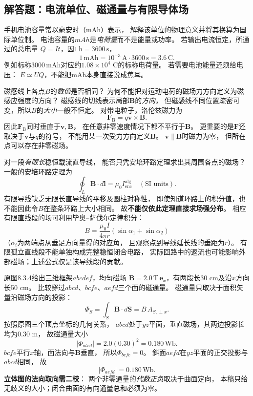 
\subsection{解答题：电流单位、磁通量与有限导体场}

\problemtext 手机电池容量常以毫安时（mAh）表示，
解释该单位的物理意义并将其换算为国际单位制。
\workings
电池容量的$mAh$是\emph{电荷量}而不是能量或功率。
若输出电流恒定，所通过的总电量
$Q=It$，因$1\,\mathrm{h}=3600\,\mathrm s$，
\[
\boxed{1\,\mathrm{mAh}=10^{-3}\,\mathrm A\cdot3600\,\mathrm s
=3.6\,\mathrm C}.
\]
例如标称$3000\,\mathrm{mAh}$对应约$1.08\times10^4$ C的标称电荷量。
\crosscheck 若需要电池能量还须给电压：
$E\simeq UQ$，不能把mAh本身直接说成焦耳。

\problemtext 磁感线上各点$B$的\emph{数值}是否相同？
为何不能把对运动电荷的磁场力方向定义为磁感应强度的方向？
\workings
磁感线的切线表示局部$\bm B$的\emph{方向}，
但磁感线不同位置疏密可变，所以$B$的\emph{大小}一般不恒定。
对带电粒子，洛伦兹磁力为
\[
\boxed{\bm F_{\mathrm B}=q\bm v\times\bm B}.
\]
因此$\bm F_{\mathrm B}$同时垂直于$\bm v,\bm B$，
在任意非零速度情况下都不平行于$\bm B$。
更重要的是$\bm F$还取决于$\bm v$与$q$的符号，
不能用某一次受力方向定义$\bm B$。
\crosscheck $\bm v\parallel\bm B$时磁力为零，
但所在点可以存在非零磁场。

\problemtext 对一段\emph{有限长}稳恒载流直导线，
能否只凭安培环路定理求出其周围各点的磁场？
\workings
一般的安培环路定理为
\[
\oint_L\bm B\cdot d\bm l=\mu_0I_{\mathrm{enc}}^{\mathrm{alg}}
\quad(\text{SI units}).
\]
有限导线缺乏无限长直导线的平移及圆柱对称性，
即使知道环路上的积分值，也不能因此令$B$在整条环路上大小相同。
故\textbf{不能仅依此定理直接求场强分布}。
相应有限直线段的场可利用毕奥--萨伐尔定律积分：
\[
\boxed{B=\frac{\mu_0I}{4\pi r}
(\sin\alpha_1+\sin\alpha_2)}
\]
（$\alpha_i$为两端点从垂足方向量得的对应角，
且观察点到导线延长线的垂距为$r$）。
\crosscheck 有限孤立直线段不能单独构成完整稳恒闭合电路，
实际回路中的返流也可能影响外部磁场；上述公式仅是该导线段的贡献。

\problemtext 原图8.3.4给出三维框架$abcdef$，均匀磁场
$\bm B=2.0\,\mathrm T\,\bm e_x$，有两段长30 cm及沿$x$方向长50 cm。
比较穿过$abcd$、$bcfe$、$aefd$三个面的磁通量。
\workings
磁通量只取决于面积矢量沿磁场方向的投影：
\[
\boxed{\Phi_S=\int_S\bm B\cdot d\bm S
=B\,A_{S,\perp x}}.
\]
按照原图三个顶点坐标的几何关系，
$abcd$处于$yz$平面，垂直磁场，其两边投影长均为$0.30$ m，
故磁通量大小
\[
\boxed{|\Phi_{abcd}|=2.0(0.30)^2=0.180\,\mathrm{Wb}}.
\]
$bcfe$平行$x$轴，面法向与$\bm B$垂直，
所以$\boxed{\Phi_{bcfe}=0}$。
斜面$aefd$在$yz$平面的正交投影与$abcd$相同，
故
\[
\boxed{|\Phi_{aefd}|=0.180\,\mathrm{Wb}}.
\]
\crosscheck \textbf{立体图的法向取向需二校}：
两个非零通量的\emph{代数正负}取决于曲面定向，
本稿只给无歧义的大小；闭合曲面的有向通量总和必须为零。

